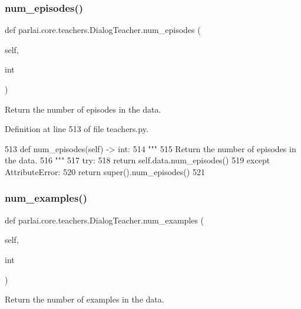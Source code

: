 \subsubsection{\texorpdfstring{num\+\_\+episodes()}{num\_episodes()}}
{\footnotesize\ttfamily def parlai.\+core.\+teachers.\+Dialog\+Teacher.\+num\+\_\+episodes (\begin{DoxyParamCaption}\item[{}]{self,  }\item[{}]{int }\end{DoxyParamCaption})}

\begin{DoxyVerb}Return the number of episodes in the data.
\end{DoxyVerb}
 

Definition at line 513 of file teachers.\+py.


\begin{DoxyCode}
513     \textcolor{keyword}{def }num\_episodes(self) -> int:
514         \textcolor{stringliteral}{"""}
515 \textcolor{stringliteral}{        Return the number of episodes in the data.}
516 \textcolor{stringliteral}{        """}
517         \textcolor{keywordflow}{try}:
518             \textcolor{keywordflow}{return} self.data.num\_episodes()
519         \textcolor{keywordflow}{except} AttributeError:
520             \textcolor{keywordflow}{return} super().num\_episodes()
521 
\end{DoxyCode}
\mbox{\label{classparlai_1_1core_1_1teachers_1_1DialogTeacher_ad90c8cac27f2db22db77e29828b94dfe}} 
\subsubsection{\texorpdfstring{num\+\_\+examples()}{num\_examples()}}
{\footnotesize\ttfamily def parlai.\+core.\+teachers.\+Dialog\+Teacher.\+num\+\_\+examples (\begin{DoxyParamCaption}\item[{}]{self,  }\item[{}]{int }\end{DoxyParamCaption})}

\begin{DoxyVerb}Return the number of examples in the data.
\end{DoxyVerb}
 

